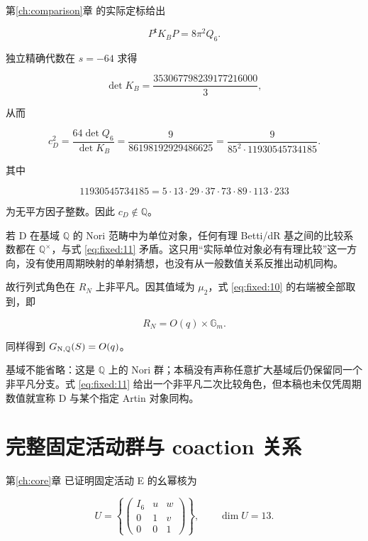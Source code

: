 \documentclass[11pt,a4paper,oneside]{ctexrep}
\theoremstyle{cnplain}
\theoremstyle{definition}
\theoremstyle{remark}
\begin{document}
第\ref{ch:comparison}章 的实际定标给出

\begin{equation}
P^{\mathsf t}K_BP=8\pi^2Q_6.
\end{equation}

独立精确代数在 \(s=- 64\) 求得

\begin{equation}
\det K_B=\frac{353067798239177216000}{3},
\end{equation}

从而

\begin{equation}
\boxed{c_D^2=\frac{64\det Q_6}{\det K_B}
        =\frac9{86198192929486625}
        =\frac9{85^2\cdot11930545734185}.}                        \label{eq:fixed:11}
\end{equation}

其中

\begin{equation}
11930545734185=5\cdot13\cdot29\cdot37\cdot73\cdot89\cdot113\cdot233
\end{equation}

为无平方因子整数。因此 \(c_D\notin\mathbb Q\)。

若 D 在基域 \(\mathbb Q\) 的 Nori 范畴中为单位对象，任何有理 Betti/dR 基之间的比较系数都在 \(\mathbb Q^\times\)，与式 \eqref{eq:fixed:11} 矛盾。这只用``实际单位对象必有有理比较''这一方向，没有使用周期映射的单射猜想，也没有从一般数值关系反推出动机同构。

故行列式角色在 \(R_N\) 上非平凡。因其值域为 \(\mu_2\)，式 \eqref{eq:fixed:10} 的右端被全部取到，即

\begin{equation}
R_N=O(q)\times\mathbb G_m.              \label{eq:fixed:12}
\end{equation}

同样得到 \(G_{\rm N,\mathbb Q}(S)=O(q)\)。

基域不能省略：这是 \(\mathbb Q\) 上的 Nori 群；本稿没有声称任意扩大基域后仍保留同一个非平凡分支。式 \eqref{eq:fixed:11} 给出一个非平凡二次比较角色，但本稿也未仅凭周期数值就宣称 D 与某个指定 Artin 对象同构。

\section{完整固定活动群与 coaction 关系}\label{sec:fixed:7}

第\ref{ch:core}章 已证明固定活动 E 的幺幂核为

\begin{equation}
U=\left\{\begin{pmatrix}I_6&u&w\\0&1&v\\0&0&1\end{pmatrix}\right\},
 \qquad \dim U=13.
\end{equation}
\end{document}
